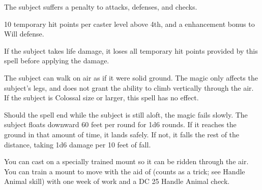 \spelldur{\durshort}
\begin{spelleffect}
    The subject suffers a  penalty to attacks, defenses, and checks.
\end{spelleffect}

\spelldur{\durshort}
\begin{spelleffect}
    10 temporary hit points  per caster level above 4th, and a  enhancement bonus to Will defense. \spellbonusscalingdescription
\end{spelleffect}
\begin{spellnotes}
    If the subject takes life damage, it loses all temporary hit points provided by this spell before applying the damage.
\end{spellnotes}

\spelldur{\durshort}
\begin{spelleffect}
    The subject can walk on air as if it were solid ground. The magic only affects the subject's legs, and does not grant the ability to climb vertically through the air. If the subject is Colossal size or larger, this spell has no effect.
    \par Should the spell end while the subject is still aloft, the magic fails slowly. The subject floats downward 60 feet per round for 1d6 rounds. If it reaches the ground in that amount of time, it lands safely. If not, it falls the rest of the distance, taking 1d6 damage per 10 feet of fall.
\end{spelleffect}
\begin{spellnotes}
    \par You can cast  on a specially trained mount so it can be ridden through the air. You can train a mount to move with the aid of  (counts as a trick; see Handle Animal skill) with one week of work and a DC 25 Handle Animal check.
\end{spellnotes}

